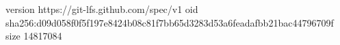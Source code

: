 version https://git-lfs.github.com/spec/v1
oid sha256:d09d058f0f5f197e8424b08c81f7bb65d3283d53a6feadafbb21bac44796709f
size 14817084
